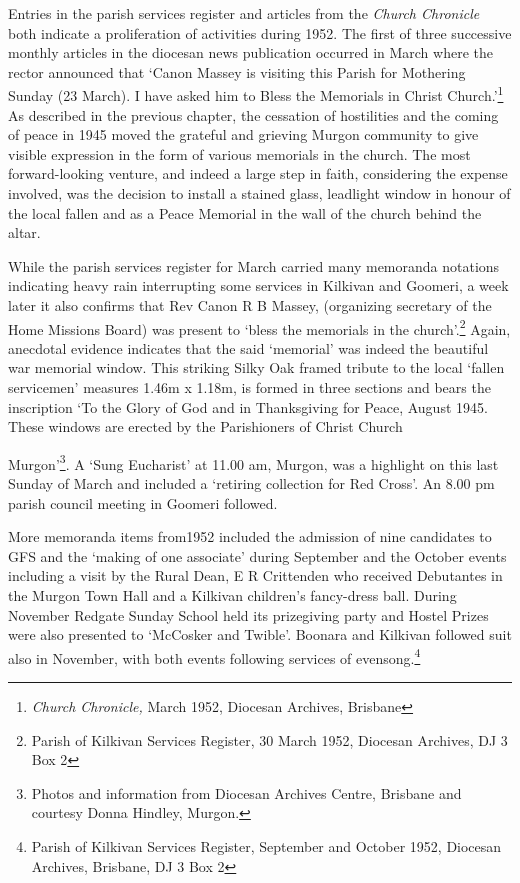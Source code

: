 Entries in the parish services register and articles from the \emph{Church Chronicle} both indicate a proliferation of activities during 1952. The first of three successive monthly articles in the diocesan news publication occurred in March where the rector announced that `Canon Massey is visiting this Parish for Mothering Sunday (23 March). I have asked him to Bless the Memorials in Christ Church.'\footnote{\emph{Church Chronicle,} March 1952, Diocesan Archives, Brisbane} As described in the previous chapter, the cessation of hostilities and the coming of peace in 1945 moved the grateful and grieving Murgon community to give visible expression in the form of various memorials in the church. The most forward-looking venture, and indeed a large step in faith, considering the expense involved, was the decision to install a stained glass, leadlight window in honour of the local fallen and as a Peace Memorial in the wall of the church behind the altar.


While the parish services register for March carried many memoranda notations indicating heavy rain interrupting some services in Kilkivan and Goomeri, a week later it also confirms that Rev Canon R B Massey, (organizing secretary of the Home Missions Board) was present to `bless the memorials in the church'.\footnote{Parish of Kilkivan Services Register, 30 March 1952, Diocesan Archives, DJ 3 Box 2} Again, anecdotal evidence indicates that the said `memorial' was indeed the beautiful war memorial window. This striking Silky Oak framed tribute to the local `fallen servicemen' measures 1.46m x 1.18m, is formed in three sections and bears the inscription `To the Glory of God and in Thanksgiving for Peace, August 1945. These windows are erected by the Parishioners of Christ Church


Murgon'\footnote{Photos and information from Diocesan Archives Centre, Brisbane and courtesy Donna Hindley, Murgon.}. A `Sung Eucharist' at 11.00 am, Murgon, was a highlight on this last Sunday of March and included a `retiring collection for Red Cross'. An 8.00 pm parish council meeting in Goomeri followed.


More memoranda items from1952 included the admission of nine candidates to GFS and the `making of one associate' during September and the October events including a visit by the Rural Dean, E R Crittenden who received Debutantes in the Murgon Town Hall and a Kilkivan children's fancy-dress ball. During November Redgate Sunday School held its prizegiving party and Hostel Prizes were also presented to `McCosker and Twible'. Boonara and Kilkivan followed suit also in November, with both events following services of evensong.\footnote{Parish of Kilkivan Services Register, September and October 1952, Diocesan Archives, Brisbane, DJ 3 Box 2}



